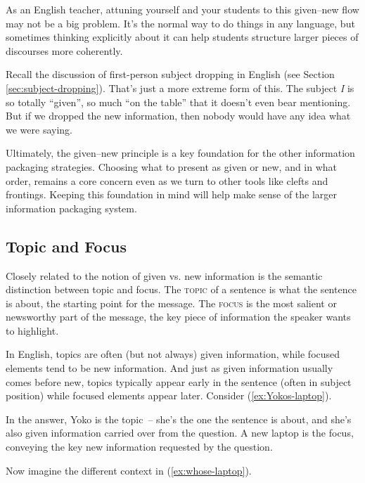 As an English teacher, attuning yourself and your students to this given--new flow may not be a big problem. It's the normal way to do things in any language, but sometimes thinking explicitly about it can help students structure larger pieces of discourses more coherently.

Recall the discussion of first-person subject dropping in English (see Section \ref{sec:subject-dropping}). That's just a more extreme form of this. The subject \textit{I} is so totally ``given'', so much ``on the table'' that it doesn't even bear mentioning. But if we dropped the new information, then nobody would have any idea what we were saying.

Ultimately, the given--new principle is a key foundation for the other information packaging strategies. Choosing what to present as given or new, and in what order, remains a core concern even as we turn to other tools like clefts and frontings. Keeping this foundation in mind will help make sense of the larger information packaging system.

\subsection{Topic and Focus} \label{sec:topic+focus}

Closely related to the notion of given vs. new information is the semantic distinction between topic and focus. The \textsc{topic} of a sentence is what the sentence is about, the starting point for the message. The \textsc{focus} is the most salient or newsworthy part of the message, the key piece of information the speaker wants to highlight.

In English, topics are often (but not always) given information, while focused elements tend to be new information. And just as given information usually comes before new, topics typically appear early in the sentence (often in subject position) while focused elements appear later. Consider (\ref{ex:Yokos-laptop}).

\label{ex:Yokos-laptop}
\z

In the answer, Yoko is the topic~-- she's the one the sentence is about, and she's also given information carried over from the question. A new laptop is the focus, conveying the key new information requested by the question.

Now imagine the different context in (\ref{ex:whose-laptop}).

